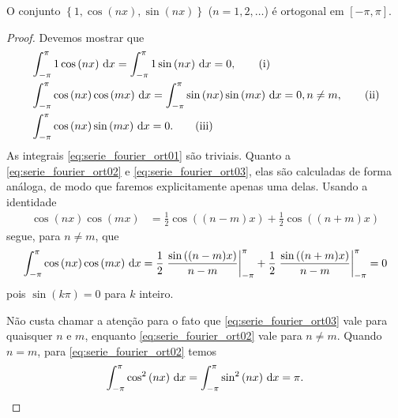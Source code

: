 \begin{prop}
    O conjunto $\left\{ 1, \cos\left( n x \right), \sin\left( n x \right) \right\}$ ($n = 1, 2, \ldots$) \'{e} ortogonal em $[-\pi, \pi]$.
\end{prop}
\begin{proof}
    Devemos mostrar que
    \begin{align}
        & \int_{-\pi}^\pi 1 \cos\left( n x \right) \, \mathrm{d}x = \int_{-\pi}^\pi 1 \sin \left( n x \right) \, \mathrm{d}x = 0, \tag{i} \label{eq:serie_fourier_ort01} \\
        & \int_{-\pi}^\pi \cos\left( n x \right) \cos\left( m x \right) \, \mathrm{d}x = \int_{-\pi}^\pi \sin\left( n x \right) \sin\left( m x \right) \, \mathrm{d}x = 0, n \neq m, \tag{ii} \label{eq:serie_fourier_ort02} \\
        & \int_{-\pi}^\pi \cos\left( n x \right) \sin\left( m x \right) \, \mathrm{d}x = 0. \tag{iii} \label{eq:serie_fourier_ort03}
    \end{align}
    As integrais \eqref{eq:serie_fourier_ort01} s\~{a}o triviais. Quanto a \eqref{eq:serie_fourier_ort02} e \eqref{eq:serie_fourier_ort03}, elas s\~{a}o calculadas de forma an\'{a}loga, de modo que faremos explicitamente apenas uma delas. Usando a identidade
    \begin{align*}
        \cos\left( n x \right) \cos\left( m x \right) &= \frac{1}{2} \cos\left( (n - m) x \right) + \frac{1}{2} \cos\left( (n + m) x \right)
    \end{align*}
    segue, para $n \neq m$, que
    \begin{align*}
        \int_{-\pi}^\pi \cos\left( n x \right) \cos\left( m x \right) \, \mathrm{d}x = \frac{1}{2} \left. \frac{\sin\left( (n - m) x \right)}{n - m} \right|_{-\pi}^\pi + \frac{1}{2} \left. \frac{\sin\left( (n + m) x \right)}{n - m} \right|_{-\pi}^\pi = 0
    \end{align*}
    pois $\sin\left( k \pi \right) = 0$ para $k$ inteiro.

    N\~{a}o custa chamar a aten\c{c}\~{a}o para o fato que \eqref{eq:serie_fourier_ort03} vale para quaisquer $n$ e $m$, enquanto \eqref{eq:serie_fourier_ort02} vale para $n \neq m$. Quando $n = m$, para \eqref{eq:serie_fourier_ort02} temos
    \begin{align*}
        \int_{-\pi}^\pi \cos^2\left( n x \right) \, \mathrm{d}x = \int_{-\pi}^\pi \sin^2\left( n x \right) \, \mathrm{d}x = \pi.
    \end{align*}
\end{proof}

